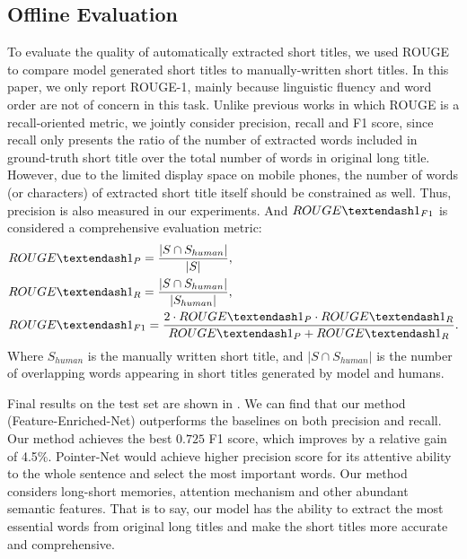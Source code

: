 
\subsection{Offline Evaluation}
\label{sec:eval_offline}
To evaluate the quality of automatically extracted short titles,
we used ROUGE \cite{lin2003automatic} to 
compare model generated
short titles to manually-written short titles.
In this paper, we only report ROUGE-1, mainly because 
linguistic fluency and word order are not of concern in this task.
Unlike previous works in which ROUGE is a recall-oriented metric,
we jointly consider precision, recall and F1 score,
since recall only presents the ratio of 
the number of extracted words included in ground-truth short title
over the total number of words in original long title.
However, due to the limited display space on mobile phones, 
the number of words (or characters) of extracted short title itself 
should be constrained as well.
Thus, precision is also measured in our experiments.
And $ROUGE\textendash1_{F1}$ is considered a comprehensive 
evaluation metric:
\begin{eqnarray*}
& ROUGE\textendash1_{P}=\frac{|S\cap S_{human}|}{|S|},\\
& ROUGE\textendash1_{R}=\frac{|S\cap S_{human}|}{|S_{human}|},\\
& ROUGE\textendash1_{F1}=\frac{2\cdot ROUGE\textendash1_{P}\cdot ROUGE\textendash1_{R}}{ROUGE\textendash1_{P}+ROUGE\textendash1_{R}}.
\end{eqnarray*}
Where $S_{human}$ is the manually written short title, 
and $|S\cap S_{human}|$ is the number of overlapping words appearing 
in short titles generated by model and humans.

Final results on the test set are shown in .
We can find that our method (Feature-Enriched-Net) outperforms the baselines 
on both precision and recall.
Our method achieves the best $0.725$ F1 score, which improves by a relative gain of 4.5\%.
Pointer-Net would achieve higher precision score 
for its attentive ability to the whole sentence and select the most important words.
Our method considers long-short memories, attention mechanism
and other abundant semantic features.
That is to say, our model has the ability to
extract the most essential words from original long titles
and make the short titles more accurate and comprehensive.

